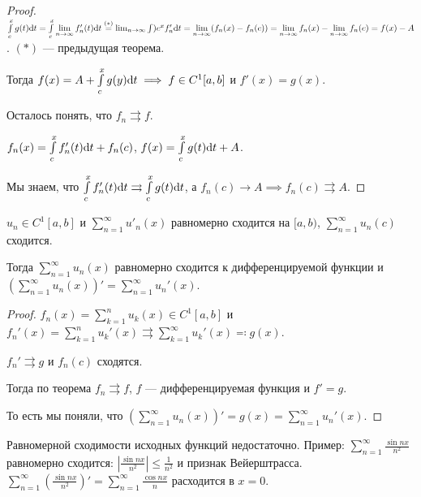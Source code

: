\begin{proof}
    $\int\limits_c^x g(t)\mathrm{d}t = \int\limits_c^x \lim\limits_{n \to \infty} f_n'(t) \mathrm{d}t \overset{(*)} = \lim_{n \to \infty} \int\limits)c^x f_n'\mathrm{d}t = \lim\limits_{n \to \infty} (f_n(x) - f_n(c)) = \lim\limits_{n \to \infty} f_n(x) - \lim\limits_{n \to \infty} f_n(c) = f(x) - A$. $(*)$ --- предыдущая теорема.

    Тогда $f(x) = A + \int\limits_c^x g(y)\mathrm{d}t \implies f \in C^1[a, b]$ и  $f'(x) = g(x)$.

    Осталось понять, что  $f_n \rightrightarrows f$.

     $f_n(x) = \int\limits_c^x f_n'(t)\mathrm{d}t + f_n(c)$,  $f(x) = \int\limits_c^x g(t)\mathrm{d}t + A$.

     Мы знаем, что  $\int\limits_c^x f_n'(t)\mathrm{d}t \rightrightarrows \int\limits_c^xg(t)\mathrm{d}t$, а $f_n(c) \to A \implies f_n(c) \rightrightarrows A$.
\end{proof}
\begin{consequence}
    $u_n \in C^1[a, b]$ и  $\sum\limits_{n=1}^\infty u'_n(x)$ равномерно сходится на  $[a, b)$,  $\sum\limits_{n=1}^\infty u_n(c)$ сходится. 

    Тогда  $\sum\limits_{n=1}^\infty u_n(x)$ равномерно сходится к дифференцируемой функции и $\left(\sum\limits_{n=1}^\infty u_n(x)\right)' = \sum\limits_{n=1}^\infty u_n'(x)$.
\end{consequence}
\begin{proof}
    $f_n(x) = \sum\limits_{k=1}^n u_k(x) \in C^1[a, b]$ и  $f_n'(x) = \sum\limits_{k=1}^n u_k'(x) \rightrightarrows \sum\limits_{k=1}^\infty u_k'(x) \eqqcolon g(x)$.

     $f_n' \rightrightarrows g$ и  $f_n(c)$ сходятся.

     Тогда по теорема  $f_n \rightrightarrows f$,  $f$ --- дифференцируемая функция и  $f' = g$.

     То есть мы поняли, что $\left(\sum\limits_{n=1}^\infty u_n(x)\right)' = g(x) = \sum\limits_{n=1}^\infty u_n'(x)$. 
\end{proof}
\begin{remark}
    Равномерной сходимости исходных функций недостаточно. Пример: $\sum\limits_{n=1}^\infty \frac{\sin nx}{n^2}$ равномерно сходится: $\left| \frac{\sin nx}{n^2} \right| \le \frac{1}{n^2}$ и признак Вейерштрасса. $\sum\limits_{n=1}^\infty \left(\frac{\sin nx}{n^2}\right)' = \sum\limits_{n=1}^\infty \frac{\cos nx}{n}$ расходится в $x = 0$.
\end{remark}
